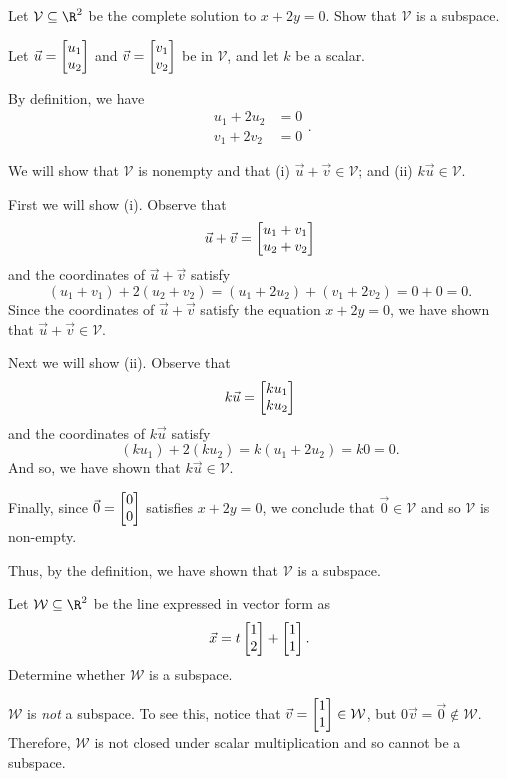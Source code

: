 \begin{example}
	Let $\mathcal V\subseteq \R^2$ be the complete solution to 
	$x+2y=0$.  Show that $\mathcal V$ is a subspace.
	
	Let $\vec u = \mat{u_1\\u_2}$ and 
	$\vec v = \mat{v_1\\v_2}$ be in $\mathcal V$, 
	and let $k$ be a scalar.
	
	By definition, we have 
	\[
	\begin{aligned}
		u_1+2u_2&=0 \\
		v_1+2v_2&=0
	\end{aligned}.
	\]
	
	We will show that $\mathcal V$ is nonempty and that
		(i) $\vec u + \vec v \in \mathcal V$; and
		(ii) $k\vec u \in \mathcal V$.
	
	First we will show (i).
	Observe that
	\[
		\vec u + \vec v = \mat{u_1+v_1\\u_2+v_2}
	\]
	and the coordinates of $\vec u+\vec v$ satisfy
	\[
		(u_1+v_1)+2(u_2+v_2)=
		(u_1+2u_2)+(v_1+2v_2)=
		0+0=0.
	\]
	Since the coordinates of $\vec u + \vec v$ satisfy the equation $x+2y=0$, 
	we have shown that $\vec u + \vec v \in \mathcal V$.
	
	Next we will show (ii).
	Observe that
	\[
		k\vec u = \mat{ku_1\\ku_2}
	\]
	and the coordinates of $k\vec u$ satisfy
	\[
		(ku_1)+2(ku_2) = 
		k(u_1+2u_2)=
		k0=0.
	\]
	And so, we have shown that $k\vec u \in \mathcal V$.
	
	Finally, since $\vec 0 = \mat{0\\0}$ satisfies $x+2y=0$, 
	we conclude that $\vec 0\in\mathcal V$
	and so $\mathcal V$ is non-empty.
	
	Thus, by the definition, we have shown that $\mathcal V$ is a subspace.	
\end{example}

\begin{example}
	Let $\mathcal W\subseteq \R^2$ be the line expressed in vector form
	as 
	\[
		\vec x=t\mat{1\\2}+\mat{1\\1}.
	\]
	Determine whether $\mathcal W$ is a subspace.

	$\mathcal W$ is \emph{not} a subspace. To see this, notice that $\vec v=\mat{1\\1}\in \mathcal W$,
	but $0\vec v=\vec 0\notin\mathcal W$. Therefore, $\mathcal W$ is not closed under scalar multiplication
	and so cannot be a subspace.
\end{example}


